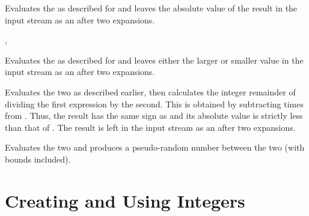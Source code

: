 \documentclass[oneside]{book}
\providecommand*\XeTeX{\hologo{XeTeX}}
\begin{document}
\begin{function}{\intMathAbs}
\begin{syntax}
 
\end{syntax}
Evaluates the  as described for
 and leaves the absolute value of the result in
the input stream as an  after two
expansions.
\end{function}

\begin{function}{\intMathMax,\intMathMin}
\begin{syntax}
  
  
\end{syntax}
Evaluates the  as described for
 and leaves either the larger or smaller value
in the input stream as an  after two
expansions.
\end{function}

\begin{function}{\intMathMod}
\begin{syntax}
  
\end{syntax}
Evaluates the two  as described earlier,
then calculates the integer remainder of dividing the first
expression by the second.  This is obtained by subtracting
   times
 from .  Thus, the result has the
same sign as  and its absolute value is strictly
less than that of .  The result is left in the input
stream as an  after two expansions.
\end{function}

\begin{function}{\intMathRand}
\begin{syntax}
  
\end{syntax}
Evaluates the two  and produces a
pseudo-random number between the two (with bounds included).
\end{function}

\section{Creating and Using Integers}
\end{document}
